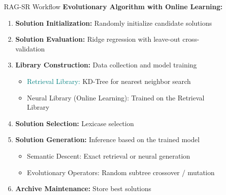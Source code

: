 \documentclass[final]{beamer}
\newcommand{\hlblue}[1]{\textcolor{mainblue}{#1}}
\newcommand{\hlpurple}[1]{\textcolor{deepplum}{#1}}
\newcommand{\hlteal}[1]{\textcolor{teal}{#1}}
\newlength{\sepwid}
\newlength{\onecolwid}
\begin{document}
\begin{frame}[t]
\begin{columns}[t]
\begin{column}{\onecolwid}
\begin{block}{RAG-SR Workflow}
                    \textbf{\hlblue{Evolutionary Algorithm with Online Learning:}}
                    \begin{enumerate}
                        \item \textbf{Solution Initialization:} Randomly initialize candidate solutions
                        \item \textbf{Solution Evaluation:} Ridge regression with leave-out cross-validation
                        \item \textbf{Library Construction:} Data collection and model training
                        \begin{itemize}
                            \normalsize
                            \item \hlteal{Retrieval Library:} KD-Tree for nearest neighbor search
                            \item \hlpurple{Neural Library (Online Learning):} Trained on the Retrieval Library
                        \end{itemize}
                        \item \textbf{Solution Selection:} Lexicase selection
                        \item \textbf{Solution Generation:} Inference based on the trained model
                        \begin{itemize}
                            \normalsize
                            \item Semantic Descent: Exact retrieval or neural generation
                            \item Evolutionary Operators: Random subtree crossover / mutation
                        \end{itemize}
                        \item \textbf{Archive Maintenance:} Store best solutions
                    \end{enumerate}
                \end{block}



            \end{column} %

            \begin{column}{\sepwid}\end{column} %

            \begin{column}{\onecolwid} %


\end{column}
\end{columns}
\end{frame}
\end{document}
